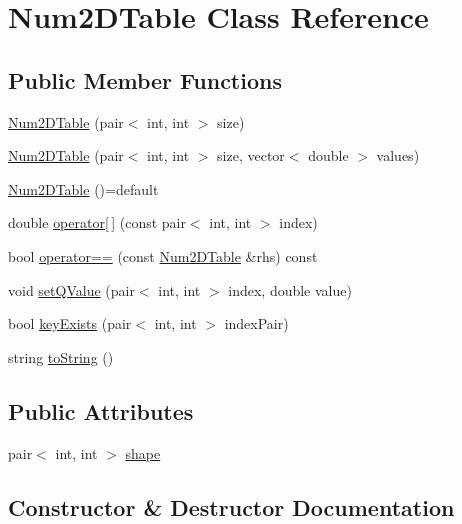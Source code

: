 \hypertarget{class_num2_d_table}{}\section{Num2\+D\+Table Class Reference}
\label{class_num2_d_table}
\subsection*{Public Member Functions}
\begin{DoxyCompactItemize}
\item 
\mbox{\hyperlink{class_num2_d_table_ae2dd3716bfdb8a21dffde4c4a406f67a}{Num2\+D\+Table}} (pair$<$ int, int $>$ size)
\item 
\mbox{\hyperlink{class_num2_d_table_a43fbd24e26b1867ddd88a7b3d71c5d82}{Num2\+D\+Table}} (pair$<$ int, int $>$ size, vector$<$ double $>$ values)
\item 
\mbox{\hyperlink{class_num2_d_table_a059c6372eacdfc2d1e046190db443363}{Num2\+D\+Table}} ()=default
\item 
double \mbox{\hyperlink{class_num2_d_table_ac87a39a241ca9a1fa4e87ec6414761b7}{operator\mbox{[}$\,$\mbox{]}}} (const pair$<$ int, int $>$ index)
\item 
bool \mbox{\hyperlink{class_num2_d_table_a037b9168eac3a5d9f806fac1fd0e2a36}{operator==}} (const \mbox{\hyperlink{class_num2_d_table}{Num2\+D\+Table}} \&rhs) const
\item 
void \mbox{\hyperlink{class_num2_d_table_a218340f919c8382a00a11cf31abbff3e}{set\+Q\+Value}} (pair$<$ int, int $>$ index, double value)
\item 
bool \mbox{\hyperlink{class_num2_d_table_a97c0b41ef1b5a47fcc9fc9889453ec59}{key\+Exists}} (pair$<$ int, int $>$ index\+Pair)
\item 
string \mbox{\hyperlink{class_num2_d_table_a09def4905eca445abdccdb76224dcc85}{to\+String}} ()
\end{DoxyCompactItemize}
\subsection*{Public Attributes}
\begin{DoxyCompactItemize}
\item 
pair$<$ int, int $>$ \mbox{\hyperlink{class_num2_d_table_a4276fb2f2884e18421c165a22cdf23dc}{shape}}
\end{DoxyCompactItemize}


\subsection{Constructor \& Destructor Documentation}
\mbox{\label{class_num2_d_table_ae2dd3716bfdb8a21dffde4c4a406f67a}} 
